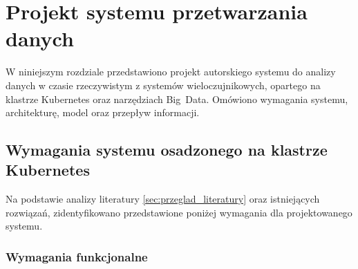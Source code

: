 \section{Projekt systemu przetwarzania danych}
\label{sec:projekt_systemu}

W niniejszym rozdziale przedstawiono projekt autorskiego systemu do analizy danych w czasie rzeczywistym z systemów wieloczujnikowych, opartego na klastrze Kubernetes oraz narzędziach \mbox{Big Data}. Omówiono wymagania systemu, architekturę, model oraz przepływ informacji.

\subsection{Wymagania systemu osadzonego na klastrze Kubernetes}
\label{subsec:wymagania}

Na podstawie analizy literatury \ref{sec:przeglad_literatury} oraz istniejących rozwiązań, zidentyfikowano przedstawione poniżej wymagania dla projektowanego systemu.

\subsubsection{Wymagania funkcjonalne}
\label{subsubsec:wymagania_funkcjonalne}

